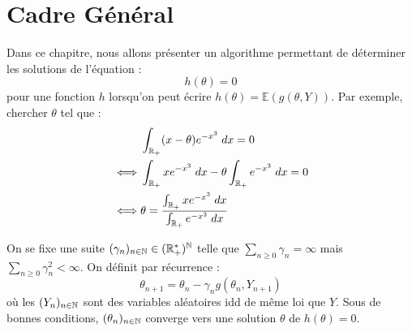 \minitoc 


\section{Cadre Général}

Dans ce chapitre, nous allons présenter un algorithme permettant de déterminer les solutions de l'équation :
    $$ h( \theta) = 0 $$ 
pour une fonction $h$ lorsqu'on peut écrire $ h ( \theta) = \mathbb{E}(g( \theta,Y))$. 
Par exemple, chercher $ \theta$ tel que : 
    \begin{align*}
        &\int_{\mathbb{R}_+} (x - \theta) e^{-x^3} \; dx = 0 \\ 
        \iff & \int_{\mathbb{R}_+} x e^{-x^3} \; dx - \theta \int_{\mathbb{R}_+} e^{-x^3} \; dx = 0 \\ 
        \iff & \theta = \frac{ \int_{\mathbb{R}_+} x e^{-x^3} \; dx }{ \int_{\mathbb{R}_+} e^{-x^3} \; dx }
    \end{align*}


\begin{proposition}[Algorithme]
    On se fixe une suite $ ( \gamma_n)_{n \in \mathbb{N}} \in (\mathbb{R}_+^*)^{\mathbb{N}}$ telle que 
    $ \sum_{n \geqslant 0} \gamma_n = \infty$ mais $ \sum_{n \geqslant 0} \gamma_n^2 < \infty$. 
    On définit par récurrence : 
        \begin{equation}
            \boxed{\theta_{n+1} = \theta_n - \gamma_n g ( \theta_n, Y_{n+1})}
        \end{equation}
    où les $(Y_n)_{n \in \mathbb{N}}$ sont des variables aléatoires idd de même loi que $Y$.
    Sous de bonnes conditions, $ (\theta_n)_{n \in \mathbb{N}}$ converge vers une solution $ \theta$ de 
    $ h( \theta) = 0$.
\end{proposition}

